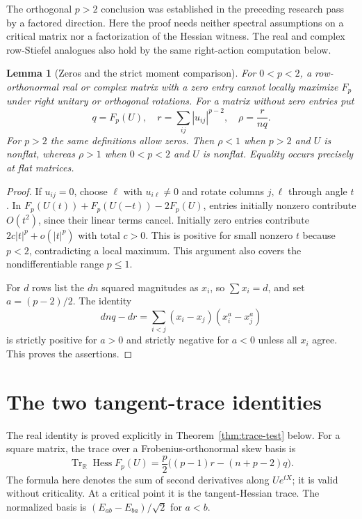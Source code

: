 \documentclass[11pt]{article}
\newtheorem{lemma}[theorem]{Lemma}
\begin{document}
The orthogonal $p>2$ conclusion was established in the preceding
research pass by a factored direction. Here the proof needs neither
spectral assumptions on a critical matrix nor a factorization of the
Hessian witness. The real and complex row-Stiefel analogues also hold
by the same right-action computation below.

\begin{lemma}[Zeros and the strict moment comparison]\label{lem:moments}
For $0<p<2$, a row-orthonormal real or complex matrix with a zero entry
cannot locally maximize $F_p$ under right unitary or orthogonal
rotations. For a matrix without zero entries put
\[
 q=F_p(U),\quad r=\sum_{ij}|u_{ij}|^{p-2},\quad \rho=\frac{r}{nq}.
\]
For $p>2$ the same definitions allow zeros. Then $\rho<1$ when
$p>2$ and $U$ is nonflat, whereas $\rho>1$ when $0<p<2$ and $U$ is
nonflat. Equality occurs precisely at flat matrices.
\end{lemma}
\begin{proof}
If $u_{ij}=0$, choose $\ell$ with $u_{i\ell}\ne0$ and rotate columns
$j,\ell$ through angle $t$. In
$F_p(U(t))+F_p(U(-t))-2F_p(U)$, entries initially nonzero contribute
$O(t^2)$, since their linear terms cancel. Initially zero entries
contribute $2c|t|^p+o(|t|^p)$ with total $c>0$. This is positive for
small nonzero $t$ because $p<2$, contradicting a local maximum.
This argument also covers the nondifferentiable range $p\le1$.

For $d$ rows list the $dn$ squared magnitudes as $x_i$, so
$\sum x_i=d$, and set $a=(p-2)/2$. The identity
\[
 dnq-dr=\sum_{i<j}(x_i-x_j)(x_i^a-x_j^a)
\]
is strictly positive for $a>0$ and strictly negative for $a<0$
unless all $x_i$ agree. This proves the assertions.
\end{proof}

\section{The two tangent-trace identities}
The real identity is proved explicitly in
Theorem~\ref{thm:trace-test} below. For a square matrix, the trace over
a Frobenius-orthonormal skew basis is
\begin{equation}\label{eq:real-trace}
 \operatorname{Tr}_{\mathbb R}\operatorname{Hess}F_p(U)
 =\frac p2\big((p-1)r-(n+p-2)q\big).
\end{equation}
The formula here denotes the sum of second derivatives along
$Ue^{tX}$; it is valid without criticality. At a critical point it
is the tangent-Hessian trace. The normalized basis is
$(E_{ab}-E_{ba})/\sqrt2$ for $a<b$.
\end{document}
